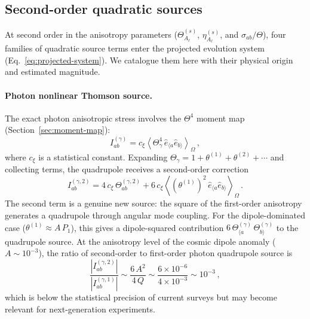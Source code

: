 \subsection{Second-order quadratic sources}
\label{sec:quadratic-sources}

At second order in the anisotropy parameters
($\Theta^{(s)}_{A_\ell}$, $\eta^{(s)}_{A_\ell}$, and
$\sigma_{ab}/\Theta$), four families of quadratic source
terms enter the projected evolution system
(Eq.~\ref{eq:projected-system}).  We catalogue them here
with their physical origin and estimated magnitude.


\paragraph{Photon nonlinear Thomson source.}

The exact photon anisotropic stress involves the
$\Theta^4$ moment map (Section~\ref{sec:moment-map}):
\begin{equation}\label{eq:exact-bridge}
I_{ab}^{(\gamma)}
= c_\xi
  \left\langle
  \Theta_\gamma^4\,
  \hat{e}_{\langle a} \hat{e}_{b\rangle}
  \right\rangle_\Omega\,,
\end{equation}
where $c_\xi$ is a statistical constant.  Expanding
$\Theta_\gamma = 1 + \theta^{(1)} + \theta^{(2)} +
\cdots$ and collecting terms, the quadrupole receives
a second-order correction
\begin{equation}\label{eq:Thomson-2nd}
I_{ab}^{(\gamma,2)}
= 4\,c_\xi\, \Theta^{(\gamma,2)}_{ab}
+ 6\,c_\xi
  \left\langle
  (\theta^{(1)})^2\,
  \hat{e}_{\langle a} \hat{e}_{b\rangle}
  \right\rangle_\Omega\,.
\end{equation}
The second term is a genuine new source: the square
of the first-order anisotropy generates a quadrupole
through angular mode coupling.  For the dipole-dominated
case ($\theta^{(1)} \approx A\,P_1$), this gives a
dipole-squared contribution
$6\,\Theta^{(\gamma)}_{\langle a}\,
\Theta^{(\gamma)}_{b\rangle}$
to the quadrupole source.  At the anisotropy level of
the cosmic dipole anomaly ($A \sim 10^{-3}$), the
ratio of second-order to first-order photon quadrupole
source is
\begin{equation}\label{eq:2nd-over-1st}
\frac{|I_{ab}^{(\gamma,2)}|}
     {|I_{ab}^{(\gamma,1)}|}
\sim \frac{6\,A^2}{4\,Q}
\sim \frac{6 \times 10^{-6}}{4 \times 10^{-3}}
\sim 10^{-3}\,,
\end{equation}
which is below the statistical precision of current
surveys but may become relevant for next-generation
experiments.


